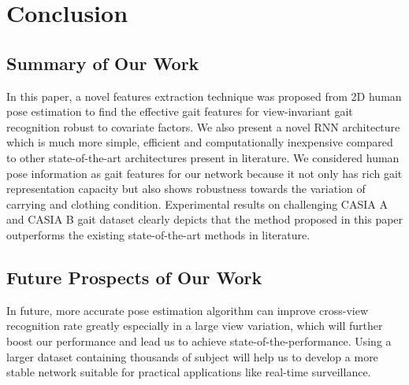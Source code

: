 \chapter{Conclusion}\label{conclusion}

\section{Summary of Our Work}
In this paper, a novel features extraction technique was proposed from 2D human pose estimation to find the effective gait features for view-invariant gait recognition robust to covariate factors. We also present a novel RNN architecture which is much more simple, efficient and computationally inexpensive compared to other state-of-the-art architectures present in literature. We considered human pose information as gait features for our network because it not only has rich gait representation capacity but also shows robustness towards the variation of carrying and clothing condition. Experimental results on challenging CASIA A and CASIA B gait dataset clearly depicts that the method proposed in this paper outperforms the existing state-of-the-art methods in literature.


\section{Future Prospects of Our Work}
In future, more accurate pose estimation algorithm can improve cross-view recognition rate greatly especially in a large view variation, which will further boost our performance and lead us to achieve state-of-the-performance. Using a larger dataset containing thousands of subject will help us to develop a more stable network suitable for practical applications like real-time surveillance. 
\endinput